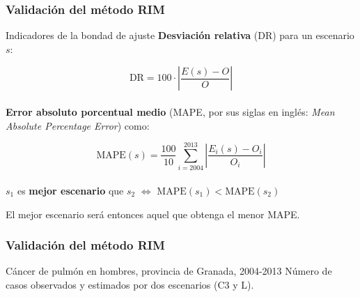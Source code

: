 \documentclass{beamer}
\begin{document}

\begin{frame}\frametitle{Validación del método RIM}

\begin{block}{Indicadores de la bondad de ajuste}
	\textbf{Desviación relativa} (DR) para un escenario $s$:
	
	$$ \text{DR} = 100 \cdot \left\lvert \dfrac{E(s) - O}{O}\right\rvert$$\\[2ex]
	
	\textbf{Error absoluto porcentual medio} (MAPE, por sus siglas en inglés: \textit{Mean Absolute Percentage Error}) como:
	
	$$\text{MAPE}(s) =  \dfrac{100}{10} \sum_{i = 2004}^{2013} \left\lvert \dfrac{E_i(s)-O_i}{O_i} \right\lvert$$\\[2ex]
	
	{\centering
	$s_1$ es \textbf{mejor escenario} que $s_2$ $\iff$ $\text{MAPE}(s_1) < \text{MAPE}(s_2)$\\[2ex]}
	
	El mejor escenario será entonces aquel que obtenga el menor MAPE.
\end{block}

\end{frame}


\begin{frame}\frametitle{Validación del método RIM}

\begin{block}{Cáncer de pulmón en hombres, provincia de Granada, 2004-2013}
	\small  Número de casos observados y estimados por dos escenarios (C3 y L).
	\vspace{-10pt}
	\begin{center}
	\end{center}
\end{block}

\end{frame}

\end{document}
